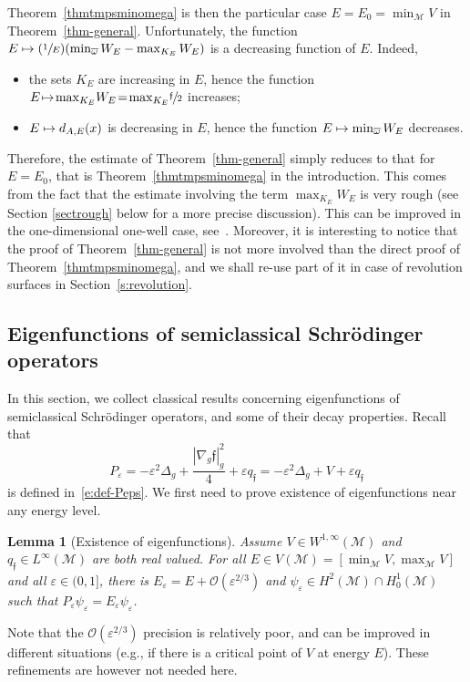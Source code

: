 \documentclass[11pt]{article}
\newcommand{\eg}{e.g.,\xspace}
\numberwithin{equation}{section}
\newcommand\mto{\mathchoice{\longmapsto}{\mapsto}{\mapsto}{\mapsto}}
\newcommand{\Psfrac}[2]{(\sfrac{#1}{#2})}
\newtheorem{lemma}{Lemma}[section]
\theoremstyle{definition}
\newcommand{\M}{\ensuremath{\mathcal M}}
\newcommand\grando[1]{\mathcal{O}\left(#1\right)}
\newcommand{\f}{\ensuremath{\mathfrak{f}}}
\newcommand\Lap{\Delta_{g}}
\newcommand\nablag{\nabla_{g}}
\let\eps\varepsilon
\let\ovl\overline
\newcommand{\qf}{q_{\f}}
\begin{document}
Theorem~\ref{thmtmpsminomega} is then the particular case $E=E_0=\min_\M V$ in Theorem~\ref{thm-general}.
Unfortunately, the function $E \mto \Psfrac{1}{E}(\min_{\ovl{\omega}}W_E - \max_{K_E} W_E)$ is a decreasing function of $E$. Indeed,
\begin{itemize}
\item the sets $K_E$ are increasing in $E$, hence the function $E\!\mto\! \max_{K_E} \!W_E\!=\! \max_{K_E} \!\sfrac{\f}{2}$ increases;
\item $E \mto d_{A,E}(x)$ is decreasing in $E$, hence the function $E \mto\min_{\ovl{\omega}}W_E$ decreases.
\end{itemize}
Therefore, the estimate of Theorem~\ref{thm-general} simply reduces to that for $E=E_0$, that is Theorem~\ref{thmtmpsminomega} in the introduction.
This comes from the fact that the estimate involving the term $\max_{K_E} W_E$ is very rough (see Section \ref{sectrough} below for a more precise discussion). This can be improved in the one-dimensional one-well case, see~\cite{LL:20-1D}.
Moreover, it is interesting to notice that the proof of Theorem~\ref{thm-general} is not more involved than the direct proof of Theorem~\ref{thmtmpsminomega}, and we shall re-use part of it in case of revolution surfaces in Section~\ref{s:revolution}.

\subsection{Eigenfunctions of semiclassical Schrödinger operators}
\label{s:sub-eig-schro}
In this section, we collect classical results concerning eigenfunctions of semiclassical Schrödinger operators, and some of their decay properties.
Recall that
\[
P_\eps = - \eps^2 \Lap + \frac{|\nablag \f|_g^2}{4} + \eps \qf = - \eps^2 \Lap + V+ \eps \qf
\]
is defined in~\eqref{e:def-Peps}.
We first need to prove existence of eigenfunctions near any energy level.
\begin{lemma}[Existence of eigenfunctions]
\label{l:exist-eig}
Assume $V \in W^{1,\infty}(\M)$ and $\qf \in L^\infty(\M)$ are both real valued.
For all $E \in V(\M) = [\min_\M V, \max_\M V]$ and all $\eps \in (0,1]$, there is $E_\eps = E + \grando{\eps^{2/3}}$ and $\psi_\eps \in H^2(\M) \cap H^1_0(\M)$ such that $P_\eps \psi_\eps = E_\eps \psi_\eps$.
\end{lemma}
Note that the $\grando{\eps^{2/3}}$ precision is relatively poor, and can be improved in different situations (\eg if there is a critical point of $V$ at energy $E$). These refinements are however not needed here.
\end{document}
